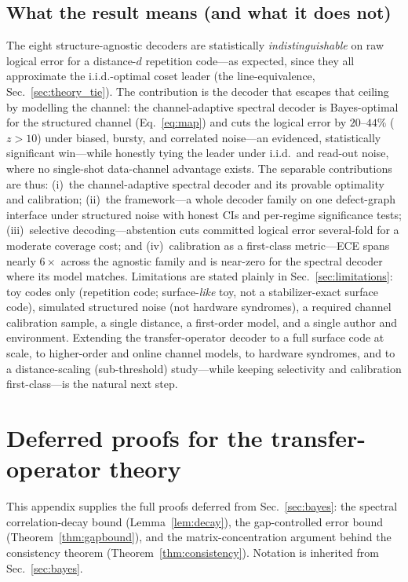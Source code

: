 \documentclass[reprint,aps,prxquantum,amsmath,amssymb,floatfix,nofootinbib,longbibliography]{revtex4-2}
\theoremstyle{definition}
\theoremstyle{remark}
\theoremstyle{plain}
\begin{document}
\subsection{What the result means (and what it does not)}
\label{sec:si_meaning}
The eight structure-agnostic decoders are statistically \emph{indistinguishable} on raw logical error for a distance-$d$ repetition code---as expected, since they all approximate the i.i.d.-optimal coset leader (the line-equivalence, Sec.~\ref{sec:theory_tie}). The contribution is the decoder that escapes that ceiling by modelling the channel: the channel-adaptive spectral decoder is Bayes-optimal for the structured channel (Eq.~\eqref{eq:map}) and cuts the logical error by $20$--$44\%$ ($z>10$) under biased, bursty, and correlated noise---an evidenced, statistically significant win---while honestly tying the leader under i.i.d.\ and read-out noise, where no single-shot data-channel advantage exists. The separable contributions are thus: (i)~the channel-adaptive spectral decoder and its provable optimality and calibration; (ii)~the framework---a whole decoder family on one defect-graph interface under structured noise with honest CIs and per-regime significance tests; (iii)~selective decoding---abstention cuts committed logical error several-fold for a moderate coverage cost; and (iv)~calibration as a first-class metric---ECE spans nearly $6\times$ across the agnostic family and is near-zero for the spectral decoder where its model matches. Limitations are stated plainly in Sec.~\ref{sec:limitations}: toy codes only (repetition code; surface-\emph{like} toy, not a stabilizer-exact surface code), simulated structured noise (not hardware syndromes), a required channel calibration sample, a single distance, a first-order model, and a single author and environment. Extending the transfer-operator decoder to a full surface code at scale, to higher-order and online channel models, to hardware syndromes, and to a distance-scaling (sub-threshold) study---while keeping selectivity and calibration first-class---is the natural next step.

\section{Deferred proofs for the transfer-operator theory}
\label{app:proofs}

This appendix supplies the full proofs deferred from Sec.~\ref{sec:bayes}:
the spectral correlation-decay bound (Lemma~\ref{lem:decay}), the
gap-controlled error bound (Theorem~\ref{thm:gapbound}), and the
matrix-concentration argument behind the consistency theorem
(Theorem~\ref{thm:consistency}). Notation is inherited from
Sec.~\ref{sec:bayes}.
\end{document}
